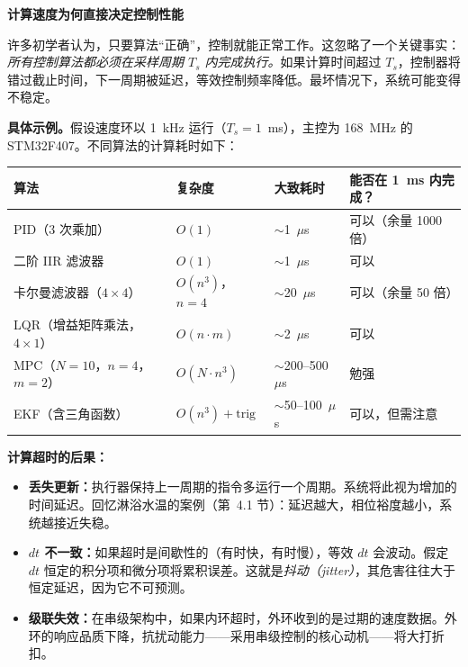 \vspace{0.5em}
\begin{mdframed}[linewidth=1pt, innertopmargin=10pt, innerbottommargin=10pt]
\textbf{计算速度为何直接决定控制性能}

\vspace{0.3em}
许多初学者认为，只要算法``正确''，控制就能正常工作。这忽略了一个关键事实：\textit{所有控制算法都必须在采样周期 $T_s$ 内完成执行。}如果计算时间超过 $T_s$，控制器将错过截止时间，下一周期被延迟，等效控制频率降低。最坏情况下，系统可能变得不稳定。

\textbf{具体示例。}假设速度环以 1~kHz 运行（$T_s = 1$~ms），主控为 168~MHz 的 STM32F407。不同算法的计算耗时如下：

\begin{center}
\begin{tabular}{llll}
\toprule
\textbf{算法} & \textbf{复杂度} & \textbf{大致耗时} & \textbf{能否在 1~ms 内完成？} \\
\midrule
PID（3 次乘加） & $O(1)$ & $\sim$1~$\mu$s & 可以（余量 1000 倍） \\
二阶 IIR 滤波器 & $O(1)$ & $\sim$1~$\mu$s & 可以 \\
卡尔曼滤波器（$4 \times 4$） & $O(n^3)$，$n=4$ & $\sim$20~$\mu$s & 可以（余量 50 倍） \\
LQR（增益矩阵乘法，$4 \times 1$） & $O(n \cdot m)$ & $\sim$2~$\mu$s & 可以 \\
MPC（$N=10$，$n=4$，$m=2$） & $O(N \cdot n^3)$ & $\sim$200--500~$\mu$s & 勉强 \\
EKF（含三角函数） & $O(n^3) + \text{trig}$ & $\sim$50--100~$\mu$s & 可以，但需注意 \\
\bottomrule
\end{tabular}
\end{center}

\textbf{计算超时的后果：}
\begin{itemize}[nosep]
    \item \textbf{丢失更新：}执行器保持上一周期的指令多运行一个周期。系统将此视为增加的时间延迟。回忆淋浴水温的案例（第~4.1 节）：延迟越大，相位裕度越小，系统越接近失稳。
    \item \textbf{$dt$ 不一致：}如果超时是间歇性的（有时快，有时慢），等效 $dt$ 会波动。假定 $dt$ 恒定的积分项和微分项将累积误差。这就是\textit{抖动（jitter）}，其危害往往大于恒定延迟，因为它不可预测。
    \item \textbf{级联失效：}在串级架构中，如果内环超时，外环收到的是过期的速度数据。外环的响应品质下降，抗扰动能力——采用串级控制的核心动机——将大打折扣。
\end{itemize}


\end{mdframed}
